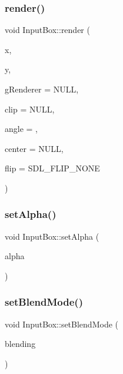 \mbox{\label{class_input_box_aaef7aedcfacc3258bdc97b1655373ac4}} 
\subsubsection{\texorpdfstring{render()}{render()}}
{\footnotesize\ttfamily void Input\+Box\+::render (\begin{DoxyParamCaption}\item[{int}]{x,  }\item[{int}]{y,  }\item[{S\+D\+L\+\_\+\+Renderer $\ast$}]{g\+Renderer = {\ttfamily NULL},  }\item[{S\+D\+L\+\_\+\+Rect $\ast$}]{clip = {\ttfamily NULL},  }\item[{double}]{angle = {},  }\item[{S\+D\+L\+\_\+\+Point $\ast$}]{center = {\ttfamily NULL},  }\item[{S\+D\+L\+\_\+\+Renderer\+Flip}]{flip = {\ttfamily SDL\+\_\+FLIP\+\_\+NONE} }\end{DoxyParamCaption})}

\mbox{\label{class_input_box_a89ed2dbe4177e9f1d1cf78b61b2bc160}} 
\subsubsection{\texorpdfstring{set\+Alpha()}{setAlpha()}}
{\footnotesize\ttfamily void Input\+Box\+::set\+Alpha (\begin{DoxyParamCaption}\item[{Uint8}]{alpha }\end{DoxyParamCaption})}

\mbox{\label{class_input_box_a98d23652bac1d030d49beccf2024e776}} 
\subsubsection{\texorpdfstring{set\+Blend\+Mode()}{setBlendMode()}}
{\footnotesize\ttfamily void Input\+Box\+::set\+Blend\+Mode (\begin{DoxyParamCaption}\item[{S\+D\+L\+\_\+\+Blend\+Mode}]{blending }\end{DoxyParamCaption})}

